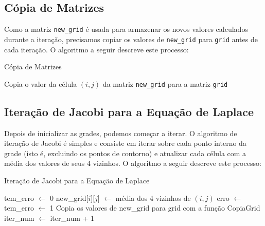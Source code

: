 \documentclass[conference]{IEEEtran}
\begin{document}
\subsection {Cópia de Matrizes}

Como a matriz \texttt{new\_grid} é usada para armazenar os novos valores calculados durante a iteração, precisamos copiar os valores de \texttt{new\_grid} para \texttt{grid} antes de cada iteração. O algoritmo a seguir descreve este processo:

\begin{algorithm}[H]
    \caption{Cópia de Matrizes}
    \begin{algorithmic}[1]
        \State Copia o valor da célula $(i, j)$ da matriz \texttt{new\_grid} para a matriz \texttt{grid}
        \EndFor
        \EndFunction
    \end{algorithmic}
\end{algorithm}

\subsection{Iteração de Jacobi para a Equação de Laplace}

Depois de inicializar as grades, podemos começar a iterar. O algoritmo de iteração de Jacobi é simples e consiste em iterar sobre cada ponto interno da grade (isto é, excluindo os pontos de contorno) e atualizar cada célula com a média dos valores de seus 4 vizinhos. O algoritmo a seguir descreve este processo:

\begin{algorithm}[H]
    \caption{Iteração de Jacobi para a Equação de Laplace}
    \begin{algorithmic}[1]
        \State tem\_erro $\gets$ 0
        \State new\_grid[$i$][$j$] $\gets$ média dos 4 vizinhos de $(i, j)$
        \State erro $\gets$ 
        \State tem\_erro $\gets$ 1
        \EndIf
        \EndFor
        \State Copia os valores de new\_grid para grid com a função CopiaGrid
        \State iter\_num $\gets$ iter\_num + 1
        \EndWhile
    \end{algorithmic}
\end{algorithm}
\end{document}
